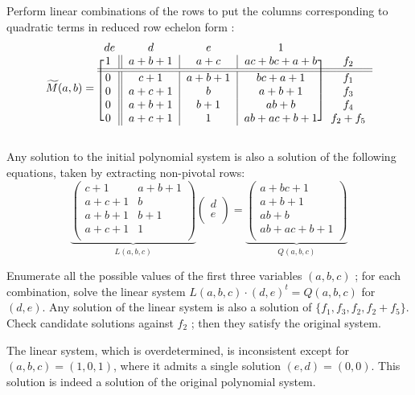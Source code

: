 \documentclass[a4paper]{article}
\begin{document}
Perform linear combinations of the rows to put the columns corresponding to
quadratic terms in reduced row echelon form :
\[
  \widetilde M(a,b) = \begin{blockarray}{ccccc}
  de & d & e & 1 & \\
  \begin{block}{[c||c|c|c]c}
    1 & a+b+1 & a+c     & ac +bc+a+b & f_2\\
    \BAhline\BAhline
    0 & c+1 & a+b+1 & bc + a + 1 & f_1\\
    0 & a+c+1 & b & a+b+1          & f_3 \\
    0 & a+b+1 & b+1 & ab+b  & f_4 \\
    0 & a+c+1 & 1 & ab+ac +b+1 & f_2 + f_5 \\
  \end{block}
\end{blockarray}
\]


Any solution to the initial polynomial system is also a solution of the
following equations, taken by extracting non-pivotal rows:
\[
  \underbrace{\begin{pmatrix}
    c+1   & a+b+1 \\
    a+c+1 & b     \\
    a+b+1 & b+1   \\
    a+c+1 & 1     \\
  \end{pmatrix}}_{L(a,b,c)}
  \begin{pmatrix}
    d \\
    e\\
  \end{pmatrix}
  =
  \underbrace{\begin{pmatrix}
  a + bc + 1 \\       
  a + b + 1 \\  
  ab + b  \\             
  ab + ac + b + 1 \\
\end{pmatrix}}_{Q(a,b,c)}
\]

Enumerate all the possible values of the first three variables $(a, b, c)$ ; for
each combination, solve the linear system $L(a,b,c) \cdot (d,e)^t = Q(a,b,c)$
for $(d,e)$. Any solution of the linear system is also a solution of
$\{f_1, f_3, f_2, f_2 + f_5\}$. Check candidate solutions against $f_2$ ; then
they satisfy the original system.

The linear system, which is overdetermined, is inconsistent except for
$(a,b,c) = (1,0,1)$, where it admits a single solution $(e, d) = (0, 0)$. This
solution is indeed a solution of the original polynomial system.
\end{document}

